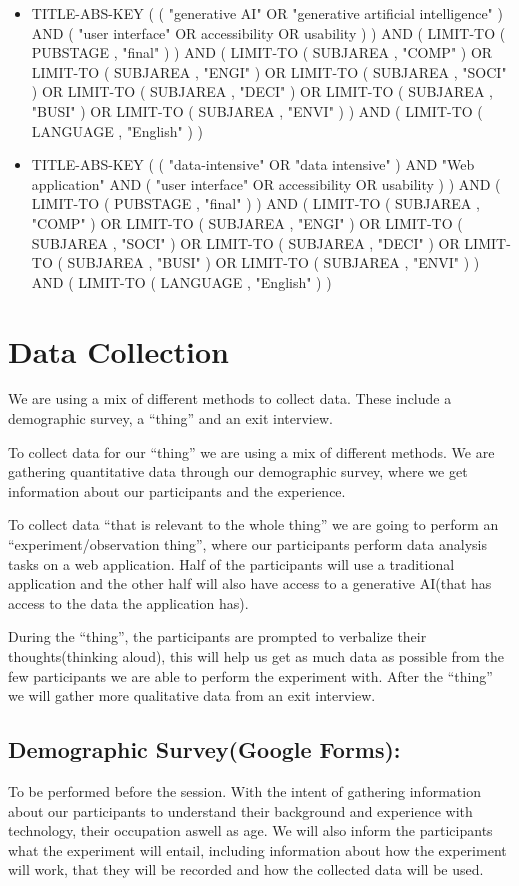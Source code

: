 \begin{itemize}
    \item TITLE-ABS-KEY ( ( "generative AI" OR "generative artificial intelligence" ) AND ( "user interface" OR accessibility OR usability ) ) AND ( LIMIT-TO ( PUBSTAGE , "final" ) ) AND ( LIMIT-TO ( SUBJAREA , "COMP" ) OR LIMIT-TO ( SUBJAREA , "ENGI" ) OR LIMIT-TO ( SUBJAREA , "SOCI" ) OR LIMIT-TO ( SUBJAREA , "DECI" ) OR LIMIT-TO ( SUBJAREA , "BUSI" ) OR LIMIT-TO ( SUBJAREA , "ENVI" ) ) AND ( LIMIT-TO ( LANGUAGE , "English" ) )

    \item TITLE-ABS-KEY ( ( "data-intensive" OR "data intensive" ) AND "Web application" AND ( "user interface" OR accessibility OR usability ) ) AND ( LIMIT-TO ( PUBSTAGE , "final" ) ) AND ( LIMIT-TO ( SUBJAREA , "COMP" ) OR LIMIT-TO ( SUBJAREA , "ENGI" ) OR LIMIT-TO ( SUBJAREA , "SOCI" ) OR LIMIT-TO ( SUBJAREA , "DECI" ) OR LIMIT-TO ( SUBJAREA , "BUSI" ) OR LIMIT-TO ( SUBJAREA , "ENVI" ) ) AND ( LIMIT-TO ( LANGUAGE , "English" ) )
\end{itemize}

\section{Data Collection}
We are using a mix of different methods to collect data. These include a demographic survey, a “thing” and an exit interview.

To collect data for our “thing” we are using a mix of different methods. We are gathering quantitative data through our demographic survey, where we get information about our participants and the experience.

To collect data “that is relevant to the whole thing” we are going to perform an “experiment/observation thing”, where our participants perform data analysis tasks on a web application. Half of the participants will use a traditional application and the other half will also have access to a generative AI(that has access to the data the application has).

During the “thing”, the participants are prompted to verbalize their thoughts(thinking aloud), this will help us get as much data as possible from the few participants we are able to perform the experiment with. After the “thing” we will gather more qualitative data from an exit interview.

\subsection{Demographic Survey(Google Forms):}
To be performed before the session. With the intent of gathering information about our participants to understand their background and experience with technology, their occupation aswell as age. We will also inform the participants what the experiment will entail, including information about how the experiment will work, that they will be recorded and how the collected data will be used.

